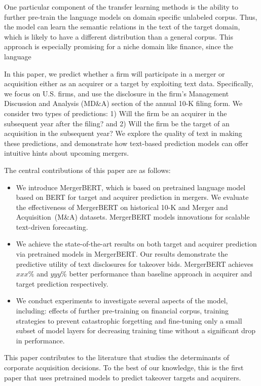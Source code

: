 \documentclass[11pt]{article}
\begin{document}
One particular component of the transfer learning methods is the
ability to further pre-train the language models on domain specific
unlabeled corpus. Thus, the model can learn the semantic relations
in the text of the target domain, which is likely to have a different
distribution than a general corpus. This approach is especially
promising for a niche domain like finance, since the language



In this paper, we predict whether a firm will participate in a merger or acquisition either as an acquirer or a target by exploiting
text data. Specifically, we focus on U.S. firms, and use the disclosure in the firm's Management
Discussion and Analysis (MD\&A) section of the annual 10-K
filing form. We consider two types of predictions: 1) Will the firm be an acquirer in the subsequent year after the filing? and 2) Will the firm
be the target of an acquisition in the subsequent year? We explore the quality of text
in making these predictions, and demonstrate how text-based prediction models can offer
intuitive hints about upcoming mergers.

The central contributions of this paper are as follows:

\begin{itemize}
\item We introduce MergerBERT, which is based on pretrained language model based
  on BERT for target and acquirer prediction in mergers. We evaluate
  the effectiveness of MergerBERT on historical 10-K and Merger and
  Acquisition~(M\&A) datasets. MergerBERT models innovations for scalable text-driven forecasting.
\item We achieve the state-of-the-art results on both target and
  acquirer prediction via pretrained models in MergerBERT. Our results demonstrate the predictive utility of text disclosures for
  takeover bids. MergerBERT achieves $xxx\%$ and $yyy\%$ better performance than
  baseline approach in acquirer and target prediction respectively.
\item We conduct experiments to investigate several aspects of
  the model, including: effects of further pre-training on financial
corpus, training strategies to prevent catastrophic
forgetting and fine-tuning only a small subset of model layers
for decreasing training time without a significant drop
in performance.
\end{itemize}

This paper contributes to the literature that studies the determinants of corporate
acquisition decisions. To the best of our knowledge, this is the first paper that uses pretrained models to predict takeover targets and
acquirers.
\end{document}
